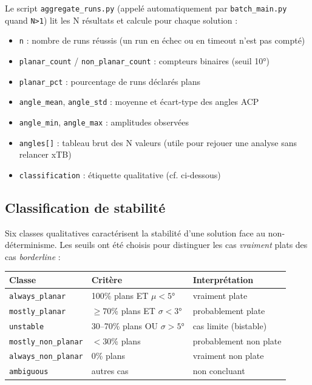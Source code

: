 Le script \texttt{aggregate\_runs.py} (appelé automatiquement par \texttt{batch\_main.py}
quand \texttt{N>1}) lit les N résultats et calcule pour chaque solution :

\begin{itemize}
  \item \texttt{n} : nombre de runs réussis (un run en échec ou en timeout n'est pas compté)
  \item \texttt{planar\_count} / \texttt{non\_planar\_count} : compteurs binaires (seuil 10°)
  \item \texttt{planar\_pct} : pourcentage de runs déclarés plans
  \item \texttt{angle\_mean}, \texttt{angle\_std} : moyenne et écart-type des angles ACP
  \item \texttt{angle\_min}, \texttt{angle\_max} : amplitudes observées
  \item \texttt{angles[]} : tableau brut des N valeurs (utile pour rejouer une analyse sans
    relancer xTB)
  \item \texttt{classification} : étiquette qualitative (cf. ci-dessous)
\end{itemize}

\subsection{Classification de stabilité}

Six classes qualitatives caractérisent la stabilité d'une solution face au non-déterminisme.
Les seuils ont été choisis pour distinguer les cas \emph{vraiment} plats des cas
\emph{borderline} :

\begin{center}
\begin{tabular}{lll}
  \toprule
  Classe & Critère & Interprétation \\
  \midrule
  \texttt{always\_planar}      & 100\% plans ET $\mu < 5°$           & vraiment plate \\
  \texttt{mostly\_planar}      & $\geq 70$\% plans ET $\sigma < 3°$  & probablement plate \\
  \texttt{unstable}            & 30--70\% plans OU $\sigma > 5°$     & cas limite (bistable) \\
  \texttt{mostly\_non\_planar} & $< 30$\% plans                      & probablement non plate \\
  \texttt{always\_non\_planar} & 0\% plans                           & vraiment non plate \\
  \texttt{ambiguous}           & autres cas                          & non concluant \\
  \bottomrule
\end{tabular}
\end{center}

